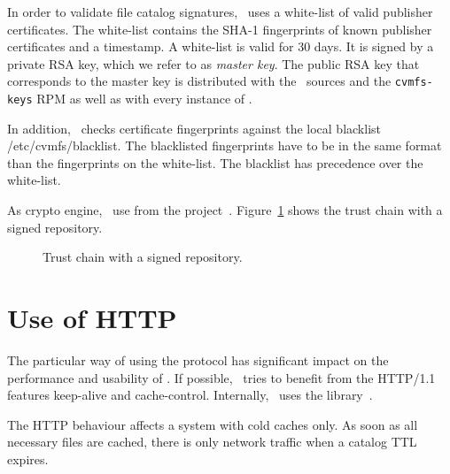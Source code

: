 In order to validate file catalog signatures, \cvmfs\ uses a white-list of valid publisher certificates.
The white-list contains the SHA-1 fingerprints of known publisher certificates and a timestamp.
A white-list is valid for 30 days.
It is signed by a private RSA key, which we refer to as \emph{master key}.
The public RSA key that corresponds to the master key is distributed with the \cvmfs\ sources and the \texttt{cvmfs-keys} RPM as well as with every instance of \cernvm.

In addition, \cvmfs\ checks certificate fingerprints against the local blacklist /etc/cvmfs/blacklist.
The blacklisted fingerprints have to be in the same format than the fingerprints on the white-list.
The blacklist has precedence over the white-list.

As crypto engine, \cvmfs\ use  from the  project~\cite{openssl}.
Figure~\ref{fig:security} shows the trust chain with a signed repository.
\begin{figure}
	\begin{center}
		
	\end{center}
	\caption{Trust chain with a signed repository.}
	\label{fig:security}
\end{figure}



\section{Use of HTTP}
The particular way of using the  protocol has significant impact on the performance and usability of \cvmfs.
If possible, \cvmfs\ tries to benefit from the HTTP/1.1 features keep-alive and cache-control.
Internally, \cvmfs\ uses the  library~\cite{libcurl}.

The HTTP behaviour affects a system with cold caches only.
As soon as all necessary files are cached, there is only network traffic when a catalog TTL expires.

